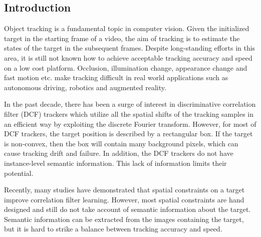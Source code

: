 \documentclass[review]{elsarticle}
\begin{document}
\begin{CJK*}{UTF8}{gbsn}

\section{Introduction}
Object tracking is a fundamental topic in computer vision. Given the initialized target in the starting frame of a video, the aim of tracking is to estimate the states of the target in the subsequent frames. Despite long-standing efforts \cite{Bolme2010VisualOT, Danelljan2014AccurateSE, Henriques2015HighSpeedTW, Li2014ASA, Nam2016LearningMC, Danelljan2015ConvolutionalFF, Wang2018SiamMask} in this area, it is still not known how to achieve acceptable tracking accuracy and speed on a low cost platform. Occlusion, illumination change, appearance change and fast motion etc. make tracking difficult in real world applications such as autonomous driving, robotics and augmented reality.

In the past decade, there has been a surge of interest in discriminative correlation filter (DCF) trackers \cite{Bolme2010VisualOT, Danelljan2014AccurateSE, Henriques2015HighSpeedTW, Li2014ASA} which utilize all the spatial shifts of the tracking samples in an efficient way by exploiting the discrete Fourier transform. However, for most of DCF trackers, the target position is described by a rectangular box. If the target is non-convex, then the box will contain many background pixels, which can cause tracking drift and failure. In addition, the DCF trackers do not have instance-level semantic information. This lack of information limits their potential.

Recently, many studies \cite{Danelljan2015LearningSR, Lukezic2017DiscriminativeCF, Galoogahi2017LearningBC, Xu2018LearningAD, Feng2018LearningSR} have demonstrated that spatial constraints on a target improve correlation filter learning. However, most spatial constraints are hand designed and still do not take account of semantic information about the target. Semantic information can be extracted from the images containing the target, but it is hard to strike a balance between tracking accuracy and speed.


\end{CJK*}
\end{document}
